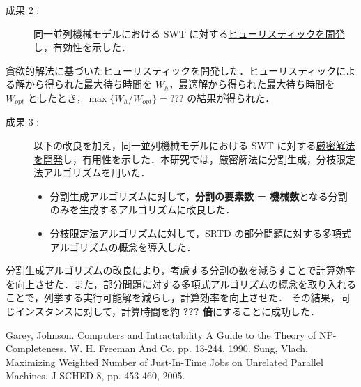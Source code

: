 \documentclass[oneside, 10pt, twocolumn]{jarticle}
\begin{document}
\begin{description}
  \item[成果 2 : ]
  同一並列機械モデルにおける SWT に対する\underline{ヒューリスティックを開発}し，有効性を示した．
\end{description}
貪欲的解法に基づいたヒューリスティックを開発した．ヒューリスティックによる解から得られた最大待ち時間を $W_h$，最適解から得られた最大待ち時間を $W_{opt}$ としたとき，\mbox{\boldmath $\max\big\{W_h/W_{opt}\big\} = ???$} の結果が得られた．

\begin{description}
  \item[成果 3 : ]
  以下の改良を加え，同一並列機械モデルにおける SWT に対する\underline{厳密解法を開発}し，有用性を示した．本研究では，厳密解法に分割生成，分枝限定法アルゴリズムを用いた．
  \begin{itemize}
    \setlength{\leftskip}{-10mm}
    \item 分割生成アルゴリズムに対して，{\bf 分割の要素数 = 機械数}となる分割のみを生成するアルゴリズムに改良した．
    \item 分枝限定法アルゴリズムに対して，SRTD の部分問題に対する多項式アルゴリズムの概念を導入した．
  \end{itemize}
\end{description}
分割生成アルゴリズムの改良により，考慮する分割の数を減らすことで計算効率を向上させた．また，部分問題に対する多項式アルゴリズムの概念を取り入れることで，列挙する実行可能解を減らし，計算効率を向上させた．
その結果，同じインスタンスに対して，計算時間を約 {\bf ??? 倍}にすることに成功した．

\begin{thebibliography}{9} %
  Garey, Johnson.
  Computers and Intractability A Guide to the Theory of NP-Completeness.
  W. H. Freeman And Co, pp. 13-244, 1990.
  Sung, Vlach.
  Maximizing Weighted Number of Just-In-Time Jobs on Unrelated Parallel Machines. J SCHED 8, pp. 453-460, 2005.
  \vspace{-2mm}
\end{thebibliography}
\end{document}
